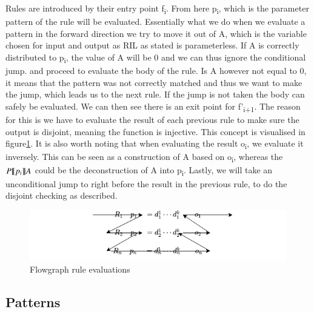\documentclass[a4paper]{article}
\begin{document}
Rules are introduced by their entry point f\textsubscript{i}. From here p\textsubscript{i}, which is the parameter pattern of the rule will be evaluated. Essentially what we do when we evaluate a pattern in the forward direction we try to move it out of A, which is the variable chosen for input and output as RIL as stated is parameterless. If A is correctly distributed to p\textsubscript{i}, the value of A will be 0 and we can thus ignore the conditional jump. and proceed to evaluate the body of the rule. Is A however not equal to 0, it means that the pattern was not correctly matched and thus we want to make the jump, which leads us to the next rule. If the jump is not taken the body can safely be evaluated. We can then see there is an exit point for f'\textsubscript{i+1}. The reason for this is we have to evaluate the result of each previous rule to make sure the output is disjoint, meaning the function is injective. This concept is visualised in figure\ref{flowg}. It is also worth noting that when evaluating the result o\textsubscript{i}, we evaluate it inversely. This can be seen as a construction of A based on o\textsubscript{i}, whereas the \(P\llbracket p_i \rrbracket A\) could be the deconstruction of A into p\textsubscript{i}. Lastly, we will take an unconditional jump to right before the result in the previous rule, to do the disjoint checking as described.
\begin{figure}[!htb]
\includegraphics[width=\textwidth]{pattern.png}
\caption{Flowgraph rule evaluations}
\label{flowg}
\end{figure}
\subsection{Patterns}
\label{sec:orge886a06}
\end{document}
